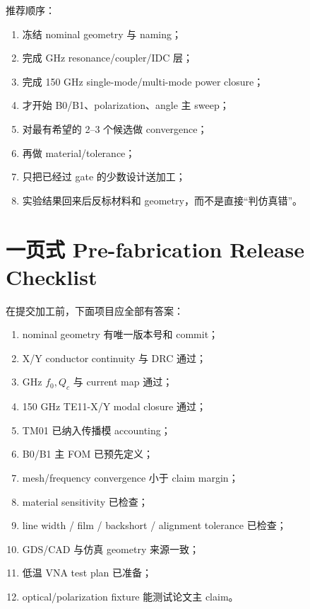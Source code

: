\documentclass[11pt,a4paper,openany]{ctexrep}
\begin{document}
推荐顺序：
\begin{enumerate}
  \item 冻结 nominal geometry 与 naming；
  \item 完成 GHz resonance/coupler/IDC 层；
  \item 完成 150 GHz single-mode/multi-mode power closure；
  \item 才开始 B0/B1、polarization、angle 主 sweep；
  \item 对最有希望的 2--3 个候选做 convergence；
  \item 再做 material/tolerance；
  \item 只把已经过 gate 的少数设计送加工；
  \item 实验结果回来后反标材料和 geometry，而不是直接“判仿真错”。
\end{enumerate}

\section{一页式 Pre-fabrication Release Checklist}

在提交加工前，下面项目应全部有答案：
\begin{notebookbox}[title=Pre-fabrication release]
\begin{enumerate}
  \item[$\square$] nominal geometry 有唯一版本号和 commit；
  \item[$\square$] X/Y conductor continuity 与 DRC 通过；
  \item[$\square$] GHz $f_0,Q_c$ 与 current map 通过；
  \item[$\square$] 150 GHz TE11-X/Y modal closure 通过；
  \item[$\square$] TM01 已纳入传播模 accounting；
  \item[$\square$] B0/B1 主 FOM 已预先定义；
  \item[$\square$] mesh/frequency convergence 小于 claim margin；
  \item[$\square$] material sensitivity 已检查；
  \item[$\square$] line width / film / backshort / alignment tolerance 已检查；
  \item[$\square$] GDS/CAD 与仿真 geometry 来源一致；
  \item[$\square$] 低温 VNA test plan 已准备；
  \item[$\square$] optical/polarization fixture 能测试论文主 claim。
\end{enumerate}
\end{notebookbox}
\end{document}

